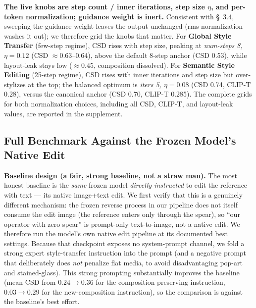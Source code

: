 \documentclass[letterpaper]{article} %
\begin{document}
\textbf{The live knobs are step count / inner iterations, step size $\eta$,
and per-token normalization; guidance weight is inert.} Consistent with
\S~3.4, sweeping the guidance weight leaves the output unchanged
(rms-normalization washes it out); we therefore grid the knobs that matter.
For \textbf{Global Style Transfer} (few-step regime), CSD rises with step
size, peaking at \emph{num-steps 8, $\eta=0.12$} (CSD $\approx
0.63$--$0.64$), above the default 8-step anchor (CSD 0.53), while layout-leak
stays low ($\approx 0.45$, composition dissolved). For \textbf{Semantic Style
Editing} (25-step regime), CSD rises with inner iterations and step size but
over-stylizes at the top; the balanced optimum is \emph{iters 5,
$\eta=0.08$} (CSD 0.74, CLIP-T 0.28), versus the canonical anchor (CSD 0.70,
CLIP-T 0.285). The complete grids for both normalization choices, including
all CSD, CLIP-T, and layout-leak values, are reported in the supplement.

\subsection{Full Benchmark Against the Frozen Model's Native Edit}

\textbf{Baseline design (a fair, strong baseline, not a straw man).} The most
honest baseline is the \emph{same} frozen model \emph{directly instructed} to
edit the reference with text --- its native image+text edit. We first verify
that this is a genuinely different mechanism: the frozen reverse process in
our pipeline does not itself consume the edit image (the reference enters
only through the spear), so ``our operator with zero spear'' is prompt-only
text-to-image, not a native edit. We therefore run the model's own native
edit pipeline at its documented best settings. Because that checkpoint
exposes no system-prompt channel, we fold a strong expert style-transfer
instruction into the prompt (and a negative prompt that deliberately does
\emph{not} penalize flat media, to avoid disadvantaging pop-art and
stained-glass). This strong prompting substantially improves the baseline
(mean CSD from $0.24\rightarrow0.36$ for the composition-preserving
instruction, $0.03\rightarrow0.29$ for the new-composition instruction), so
the comparison is against the baseline's best effort.
\end{document}
